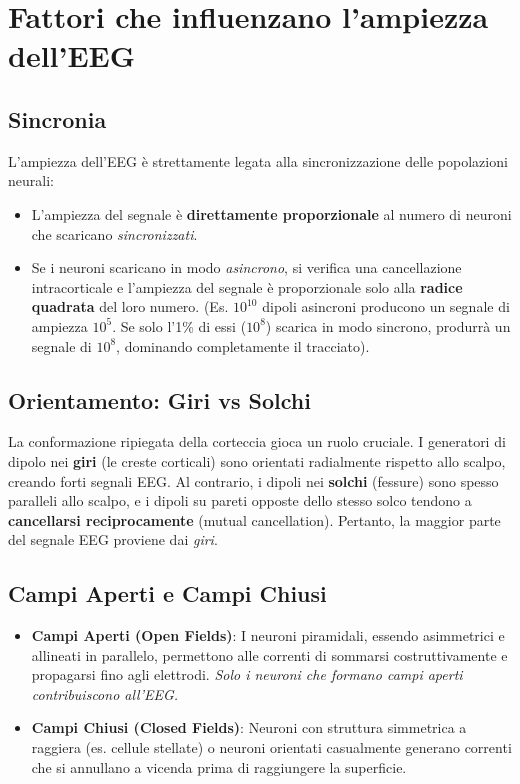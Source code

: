 \section{Fattori che influenzano l'ampiezza dell'EEG}

\subsection{Sincronia}
L'ampiezza dell'EEG è strettamente legata alla sincronizzazione delle popolazioni neurali:
\begin{itemize}
    \item L'ampiezza del segnale è \textbf{direttamente proporzionale} al numero di neuroni che scaricano \textit{sincronizzati}.
    \item Se i neuroni scaricano in modo \textit{asincrono}, si verifica una cancellazione intracorticale e l'ampiezza del segnale è proporzionale solo alla \textbf{radice quadrata} del loro numero. 
    (Es. $10^{10}$ dipoli asincroni producono un segnale di ampiezza $10^5$. Se solo l'1\% di essi ($10^8$) scarica in modo sincrono, produrrà un segnale di $10^8$, dominando completamente il tracciato).
\end{itemize}

\subsection{Orientamento: Giri vs Solchi}
La conformazione ripiegata della corteccia gioca un ruolo cruciale. I generatori di dipolo nei \textbf{giri} (le creste corticali) sono orientati radialmente rispetto allo scalpo, creando forti segnali EEG. 
Al contrario, i dipoli nei \textbf{solchi} (fessure) sono spesso paralleli allo scalpo, e i dipoli su pareti opposte dello stesso solco tendono a \textbf{cancellarsi reciprocamente} (mutual cancellation). Pertanto, la maggior parte del segnale EEG proviene dai \textit{giri}.

\subsection{Campi Aperti e Campi Chiusi}
\begin{itemize}
    \item \textbf{Campi Aperti (Open Fields)}: I neuroni piramidali, essendo asimmetrici e allineati in parallelo, permettono alle correnti di sommarsi costruttivamente e propagarsi fino agli elettrodi. \textit{Solo i neuroni che formano campi aperti contribuiscono all'EEG.}
    \item \textbf{Campi Chiusi (Closed Fields)}: Neuroni con struttura simmetrica a raggiera (es. cellule stellate) o neuroni orientati casualmente generano correnti che si annullano a vicenda prima di raggiungere la superficie.
\end{itemize}

